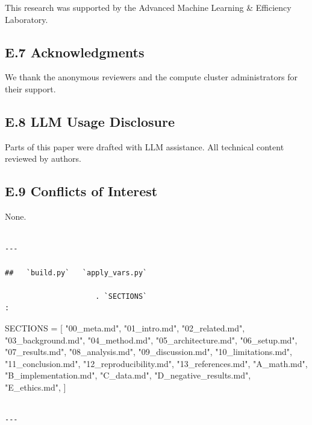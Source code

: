 This research was supported by the Advanced Machine Learning \& Efficiency Laboratory.

\subsection{E.7 Acknowledgments}

We thank the anonymous reviewers and the compute cluster administrators for their support.

\subsection{E.8 LLM Usage Disclosure}

Parts of this paper were drafted with LLM assistance. All technical content 
reviewed by authors.

\subsection{E.9 Conflicts of Interest}

None.
\begin{lstlisting}

---

##   `build.py`   `apply_vars.py`

                     . `SECTIONS`                                     :

\end{lstlisting}
SECTIONS = [
    "00\_meta.md", "01\_intro.md", "02\_related.md", "03\_background.md",
    "04\_method.md", "05\_architecture.md", "06\_setup.md", "07\_results.md",
    "08\_analysis.md", "09\_discussion.md", "10\_limitations.md",
    "11\_conclusion.md", "12\_reproducibility.md", "13\_references.md",
    "A\_math.md", "B\_implementation.md", "C\_data.md",
    "D\_negative\_results.md", "E\_ethics.md",
]
\begin{lstlisting}

---
\end{lstlisting}